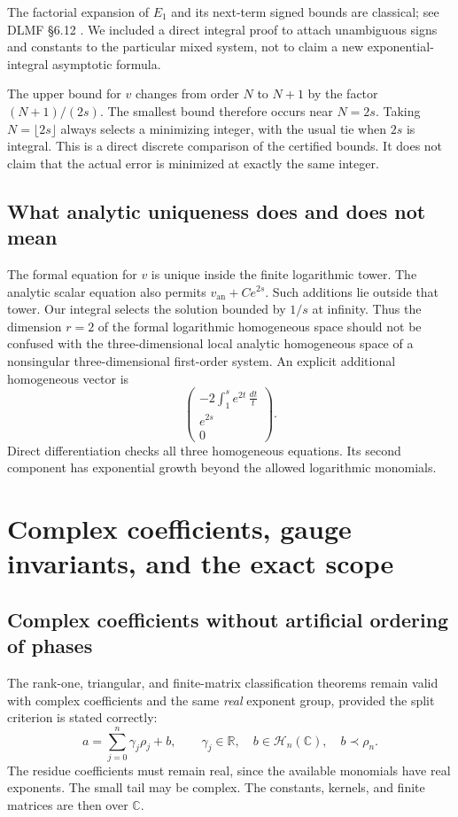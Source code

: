 \documentclass[11pt,a4paper]{article}
\numberwithin{equation}{section}
\theoremstyle{definition}
\theoremstyle{remark}\newtheorem{remark}[theorem]{Remark}
\newcommand{\R}{\mathbb R}\newcommand{\C}{\mathbb C}
\newcommand{\Hh}{\mathcal H}\newcommand{\Ll}{\mathcal L}
\begin{document}
The factorial expansion of $E_1$ and its next-term signed bounds are classical; see DLMF \S6.12 \cite{dlmf}. We included a direct integral proof to attach unambiguous signs and constants to the particular mixed system, not to claim a new exponential-integral asymptotic formula.

The upper bound for $v$ changes from order $N$ to $N+1$ by the factor $(N+1)/(2s)$. The smallest bound therefore occurs near $N=2s$. Taking $N=\lfloor2s\rfloor$ always selects a minimizing integer, with the usual tie when $2s$ is integral. This is a direct discrete comparison of the certified bounds. It does not claim that the actual error is minimized at exactly the same integer.

\subsection{What analytic uniqueness does and does not mean}
The formal equation for $v$ is unique inside the finite logarithmic tower. The analytic scalar equation also permits $v_{\mathrm{an}}+Ce^{2s}$. Such additions lie outside that tower. Our integral selects the solution bounded by $1/s$ at infinity. Thus the dimension $r=2$ of the formal logarithmic homogeneous space should not be confused with the three-dimensional local analytic homogeneous space of a nonsingular three-dimensional first-order system. An explicit additional homogeneous vector is
\[
 \begin{pmatrix}
 -2\displaystyle\int_1^s e^{2t}\,\frac{dt}{t}\\[0.4em]
 e^{2s}\\0
 \end{pmatrix}.
\]
Direct differentiation checks all three homogeneous equations. Its second component has exponential growth beyond the allowed logarithmic monomials.

\section{Complex coefficients, gauge invariants, and the exact scope}
\label{sec:extensions}
\subsection{Complex coefficients without artificial ordering of phases}
The rank-one, triangular, and finite-matrix classification theorems remain valid with complex coefficients and the same \emph{real} exponent group, provided the split criterion is stated correctly:
\begin{equation}
 a=\sum_{j=0}^n\gamma_j\rho_j+b,
 \qquad \gamma_j\in\R,\quad b\in\Hh_n(\C),\quad b\prec\rho_n.
 \label{eq:complexcriterion}
\end{equation}
The residue coefficients must remain real, since the available monomials have real exponents. The small tail may be complex. The constants, kernels, and finite matrices are then over $\C$.
\end{document}
